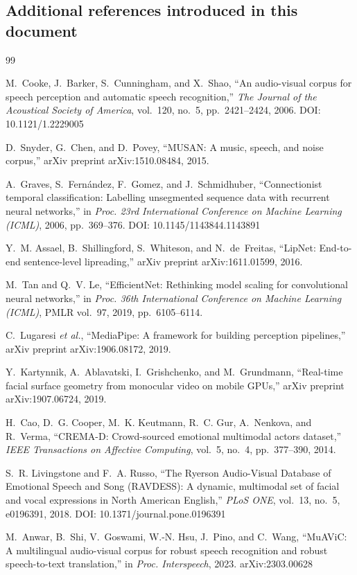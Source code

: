 \subsection*{Additional references introduced in this document}
\begingroup
\renewcommand{\section}[2]{}%
\small
\begin{thebibliography}{99}
\setlength{\itemsep}{3pt}
\makeatletter\setcounter{\@listctr}{8}\makeatother

M.~Cooke, J.~Barker, S.~Cunningham, and X.~Shao, ``An audio-visual corpus for speech
perception and automatic speech recognition,'' \emph{The Journal of the Acoustical
Society of America}, vol.~120, no.~5, pp.~2421--2424, 2006. DOI: 10.1121/1.2229005

D.~Snyder, G.~Chen, and D.~Povey, ``MUSAN: A music, speech, and noise corpus,''
arXiv preprint arXiv:1510.08484, 2015.

A.~Graves, S.~Fern\'andez, F.~Gomez, and J.~Schmidhuber, ``Connectionist temporal
classification: Labelling unsegmented sequence data with recurrent neural
networks,'' in \emph{Proc. 23rd International Conference on Machine Learning
(ICML)}, 2006, pp.~369--376. DOI: 10.1145/1143844.1143891

Y.~M. Assael, B.~Shillingford, S.~Whiteson, and N.~de~Freitas, ``LipNet: End-to-end
sentence-level lipreading,'' arXiv preprint arXiv:1611.01599, 2016.

M.~Tan and Q.~V. Le, ``EfficientNet: Rethinking model scaling for convolutional
neural networks,'' in \emph{Proc. 36th International Conference on Machine Learning
(ICML)}, PMLR vol.~97, 2019, pp.~6105--6114.

C.~Lugaresi \emph{et al.}, ``MediaPipe: A framework for building perception
pipelines,'' arXiv preprint arXiv:1906.08172, 2019.

Y.~Kartynnik, A.~Ablavatski, I.~Grishchenko, and M.~Grundmann, ``Real-time facial
surface geometry from monocular video on mobile GPUs,'' arXiv preprint
arXiv:1907.06724, 2019.

H.~Cao, D.~G. Cooper, M.~K. Keutmann, R.~C. Gur, A.~Nenkova, and R.~Verma,
``CREMA-D: Crowd-sourced emotional multimodal actors dataset,'' \emph{IEEE
Transactions on Affective Computing}, vol.~5, no.~4, pp.~377--390, 2014.

S.~R. Livingstone and F.~A. Russo, ``The Ryerson Audio-Visual Database of Emotional
Speech and Song (RAVDESS): A dynamic, multimodal set of facial and vocal
expressions in North American English,'' \emph{PLoS ONE}, vol.~13, no.~5,
e0196391, 2018. DOI: 10.1371/journal.pone.0196391

M.~Anwar, B.~Shi, V.~Goswami, W.-N. Hsu, J.~Pino, and C.~Wang, ``MuAViC: A
multilingual audio-visual corpus for robust speech recognition and robust
speech-to-text translation,'' in \emph{Proc. Interspeech}, 2023.
arXiv:2303.00628

\end{thebibliography}
\endgroup
